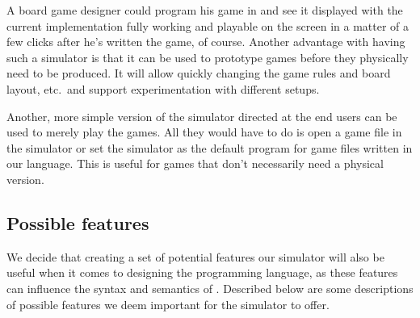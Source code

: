 A board game designer could program his game in \productname{} and see
it displayed with the current implementation fully working and playable
on the screen in a matter of a few clicks after he's written the game,
of course. Another advantage with having such a simulator is that it can
be used to prototype games before they physically need to be produced.
It will allow quickly changing the game rules and board layout, etc.\
and support experimentation with different setups.

Another, more simple version of the simulator directed at the end users
can be used to merely play the games. All they would have to do is open
a game file in the simulator or set the simulator as the default program
for game files written in our language. This is useful for games that
don't necessarily need a physical version.

\subsection{Possible features} We decide that creating a set of
potential features our simulator will also be useful when it comes to
designing the programming language, as these features can influence
the syntax and semantics of \productname{}. Described below are some
descriptions of possible features we deem important for the simulator to
offer.

